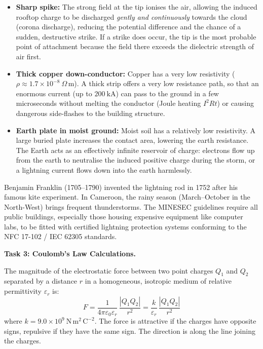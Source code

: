 \documentclass[11pt]{article}
\begin{document}
\begin{propriete}
\begin{itemize}
\item \textbf{Sharp spike:} The strong field at the tip ionises the air, allowing the induced rooftop charge to be discharged \emph{gently and continuously} towards the cloud (corona discharge), reducing the potential difference and the chance of a sudden, destructive strike. If a strike does occur, the tip is the most probable point of attachment because the field there exceeds the dielectric strength of air first.
\item \textbf{Thick copper down-conductor:} Copper has a very low resistivity ($\rho \approx 1.7\times 10^{-8}\ \Omega\,\mathrm{m}$). A thick strip offers a very low resistance path, so that an enormous current (up to $200\ \mathrm{kA}$) can pass to the ground in a few microseconds without melting the conductor (Joule heating $I^2Rt$) or causing dangerous side-flashes to the building structure.
\item \textbf{Earth plate in moist ground:} Moist soil has a relatively low resistivity. A large buried plate increases the contact area, lowering the earth resistance. The Earth acts as an effectively infinite reservoir of charge: electrons flow up from the earth to neutralise the induced positive charge during the storm, or a lightning current flows down into the earth harmlessly.
\end{itemize}
\end{propriete}

\begin{savaistu}
Benjamin Franklin (1705--1790) invented the lightning rod in 1752 after his famous kite experiment. In Cameroon, the rainy season (March--October in the North-West) brings frequent thunderstorms. The MINESEC guidelines require all public buildings, especially those housing expensive equipment like computer labs, to be fitted with certified lightning protection systems conforming to the NFC 17-102 / IEC 62305 standards.
\end{savaistu}

\textbf{Task 3: Coulomb's Law Calculations.}

\begin{propriete}
The magnitude of the electrostatic force between two point charges $Q_1$ and $Q_2$ separated by a distance $r$ in a homogeneous, isotropic medium of relative permittivity $\varepsilon_r$ is:
\[
F = \frac{1}{4\pi\varepsilon_0\varepsilon_r}\,\frac{|Q_1 Q_2|}{r^2} = \frac{k}{\varepsilon_r}\,\frac{|Q_1 Q_2|}{r^2}
\]
where $k = 9.0\times 10^{9}\ \mathrm{N\,m^2\,C^{-2}}$. The force is attractive if the charges have opposite signs, repulsive if they have the same sign. The direction is along the line joining the charges.
\end{propriete}
\end{document}
